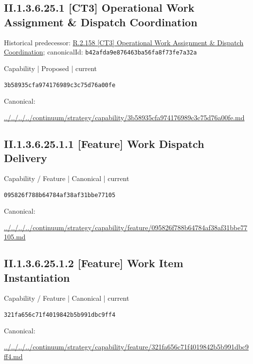 \documentclass[10pt,a4paper]{article}
\begin{document}
\subsection*{II.1.3.6.25.1 [CT3] Operational Work Assignment \& Dispatch Coordination}
Historical predecessor: \hyperref[element-b42afda9e876463ba56fa8f73fe7a32a]{R.2.158 [CT3] Operational Work Assignment \& Dispatch Coordination}; canonicalId: \texttt{b42afda9e876463ba56fa8f73fe7a32a}\par
\label{element-3b58935cfa974176989c3c75d76a00fe}
{\small Capability | Proposed | current}\par
\texttt{3b58935cfa974176989c3c75d76a00fe}\par
Canonical: \par
{\footnotesize\url{../../../../continuum/strategy/capability/3b58935cfa974176989c3c75d76a00fe.md}}\par
\subsection*{II.1.3.6.25.1.1 [Feature] Work Dispatch Delivery}
\label{element-095826f788b64784af38af31bbe77105}
{\small Capability / Feature | Canonical | current}\par
\texttt{095826f788b64784af38af31bbe77105}\par
Canonical: \par
{\footnotesize\url{../../../../continuum/strategy/capability/feature/095826f788b64784af38af31bbe77105.md}}\par
\subsection*{II.1.3.6.25.1.2 [Feature] Work Item Instantiation}
\label{element-321fa656c71f4019842b5b991dbc9ff4}
{\small Capability / Feature | Canonical | current}\par
\texttt{321fa656c71f4019842b5b991dbc9ff4}\par
Canonical: \par
{\footnotesize\url{../../../../continuum/strategy/capability/feature/321fa656c71f4019842b5b991dbc9ff4.md}}\par
\end{document}
